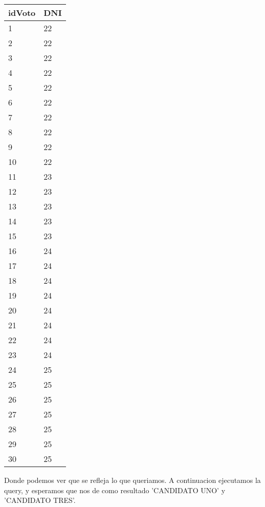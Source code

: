 \begin{itemize}
\vspace{2mm}	
 	
 \begin{tabular}{| l| l|}
	\hline 
	    idVoto & DNI \\
	  \hline 
	   1 &22  \\
	   \hline 
	   2 &22  \\
	   \hline 
	   3 &22  \\
	   \hline 
	   4 &22  \\
	   \hline 
	   5 &22  \\
	   \hline 
	   6 &22  \\
	   \hline 
	   7 &22  \\
	   \hline 
	   8 &22  \\
	   \hline 
	   9 &22  \\
	   \hline 
	   10 &22  \\
	   \hline 
	   11 &23  \\
	   \hline 
	   12 &23  \\
	   \hline 
	   13 &23  \\
	    \hline 
	   14 &23  \\
	   \hline 
	   15 &23  \\
	   \hline 
	   16 &24  \\
	   \hline 
	   17 &24  \\
	   \hline 
	   18 &24  \\
	   \hline 
	   19 &24  \\	 
	     \hline 
	   20 &24  \\	 
	     \hline 
	   21 &24  \\
	   \hline 
	   22 &24  \\	
	      \hline 
	   23 &24  \\	 
	     \hline 
	   24 &25  \\
	   \hline 
	   25 &25  \\	  
	    \hline 
	   26 &25  \\	  
	    \hline 
	   27 &25  \\	  
	    \hline 
	   28 &25  \\	 
	     \hline 
	   29 &25  \\	 
	     \hline 
	   30 &25  \\
	   \hline 
	\end{tabular}
	\vspace{2mm}	

Donde podemos ver que se refleja lo que queriamos. A continuacion ejecutamos la query, y esperamos que nos de como resultado 'CANDIDATO UNO' y 'CANDIDATO TRES'.



\end{itemize}
